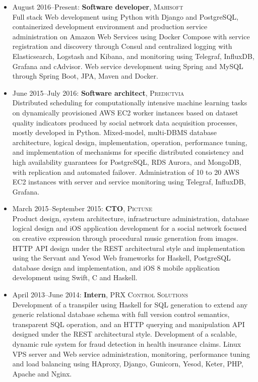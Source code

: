 \documentclass{res}
\begin{document}
\begin{resume}
\begin{itemize}[leftmargin=-0.3in]
    \item
      August 2016--Present: \textbf{Software developer}, \textsc{Mahisoft}
      \\ \small{Full stack Web development using Python with Django and PostgreSQL, containerized development environment and production service administration on Amazon Web Services using Docker Compose with service registration and discovery through Consul and centralized logging with Elasticsearch, Logstash and Kibana, and monitoring using Telegraf, InfluxDB, Grafana and cAdvisor.  Web service development using Spring and MySQL through Spring Boot, JPA, Maven and Docker.}

    \item
      June 2015--July 2016: \textbf{Software architect}, \textsc{Predictvia}
      \\ \small{Distributed scheduling for computationally intensive machine learning tasks on dynamically provisioned AWS EC2 worker instances based on dataset quality indicators produced by social network data acquisition processes, mostly developed in Python.  Mixed-model, multi-DBMS database architecture, logical design, implementation, operation, performance tuning, and implementation of mechanisms for specific distributed consistency and high availability guarantees for PostgreSQL, RDS Aurora, and MongoDB, with replication and automated failover.  Administration of 10 to 20 AWS EC2 instances with server and service monitoring using Telegraf, InfluxDB, Grafana.}

    \item
      March 2015--September 2015: \textbf{CTO}, \textsc{Pictune}
      \\ \small{Product design, system architecture, infrastructure administration, database logical design and iOS application development for a social network focused on creative expression through procedural music generation from images.  HTTP API design under the REST architectural style and implementation using the Servant and Yesod Web frameworks for Haskell, PostgreSQL database design and implementation, and iOS 8 mobile application development using Swift, C and Haskell.}

    \item
      April 2013--June 2014: \textbf{Intern}, \textsc{PRX Control Solutions}
      \\ \small{Development of a transpiler using Haskell for SQL generation to extend any generic relational database schema with full version control semantics, transparent SQL operation, and an HTTP querying and manipulation API designed under the REST architectural style.  Development of a scalable, dynamic rule system for fraud detection in health insurance claims.  Linux VPS server and Web service administration, monitoring, performance tuning and load balancing using HAproxy, Django, Gunicorn, Yesod, Keter, PHP, Apache and Nginx.}


\end{itemize}
\end{resume}
\end{document}
